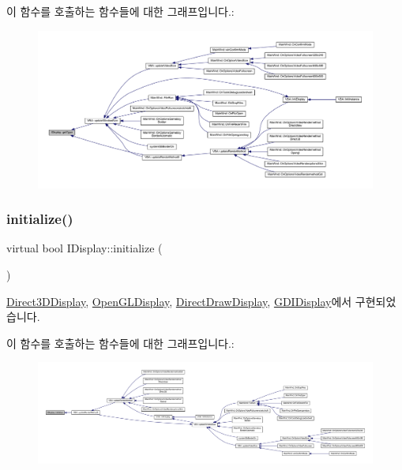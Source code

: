 이 함수를 호출하는 함수들에 대한 그래프입니다.\+:
\nopagebreak
\begin{figure}[H]
\begin{center}
\leavevmode
\includegraphics[width=350pt]{class_i_display_a2c7fd4c6721dd8a6992b78f0c588f6f9_icgraph}
\end{center}
\end{figure}
\mbox{\label{class_i_display_aa849b5d829138d08cf9efdbb00364a96}} 
\subsubsection{\texorpdfstring{initialize()}{initialize()}}
{\footnotesize\ttfamily virtual bool I\+Display\+::initialize (\begin{DoxyParamCaption}{ }\end{DoxyParamCaption})\hspace{0.3cm}{\ttfamily [pure virtual]}}



\mbox{\hyperlink{class_direct3_d_display_a8b8dfd84005816382396677e23d38879}{Direct3\+D\+Display}}, \mbox{\hyperlink{class_open_g_l_display_af0db619c7083f43e9bc61f1705843b53}{Open\+G\+L\+Display}}, \mbox{\hyperlink{class_direct_draw_display_a310109ff2530aaa109ed048ede6e1564}{Direct\+Draw\+Display}}, \mbox{\hyperlink{class_g_d_i_display_a7d3e0b3443b68302d759d7cdecd718ef}{G\+D\+I\+Display}}에서 구현되었습니다.

이 함수를 호출하는 함수들에 대한 그래프입니다.\+:
\nopagebreak
\begin{figure}[H]
\begin{center}
\leavevmode
\includegraphics[width=350pt]{class_i_display_aa849b5d829138d08cf9efdbb00364a96_icgraph}
\end{center}
\end{figure}
\mbox{\label{class_i_display_ad717007b624f0a8e7c830ab803cd8a92}} 
